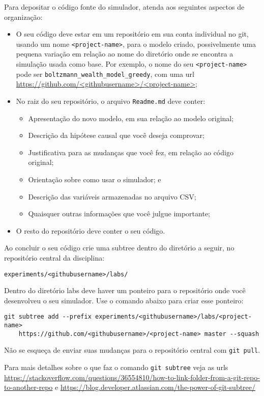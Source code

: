 Para depositar o código fonte do simulador, atenda aos seguintes aspectos de organização:
\begin{itemize}
    \item O seu código deve estar em um repositório em sua conta individual no git, usando um nome \verb|<project-name>|, para o modelo criado, possivelmente uma pequena variação em relação ao nome do diretório onde se encontra a simulação usada como base. Por exemplo, o nome do seu \verb|<project-name>| pode ser
    \verb|boltzmann_wealth_model_greedy|, com uma url \url{https://github.com/<githubusername>/<project-name>};
    \item No raiz do seu repositório, o arquivo \verb|Readme.md| deve conter:
    \begin{itemize}
        \item Apresentação do novo modelo, em sua relação ao modelo original;
        \item Descrição da hipótese causal que você deseja comprovar;
        \item Justificativa para as mudanças que você fez, em relação ao código original;
        \item Orientação sobre como usar o simulador; e
        \item Descrição das variáveis armazenadas no arquivo CSV;
        \item Quaisquer outras informações que você julgue importante;
    \end{itemize}
    \item O resto do repositório deve conter o seu código.
\end{itemize}

Ao concluir o seu código crie uma subtree dentro do diretório a seguir, no repositório central da disciplina:

\verb|experiments/<githubusername>/labs/|

Dentro do diretório labs deve haver um ponteiro para o repositório onde você desenvolveu o seu simulador. Use o comando abaixo para criar esse ponteiro:

{\footnotesize
\begin{verbatim}
git subtree add --prefix experiments/<githubusername>/labs/<project-name> 
    https://github.com/<githubusername>/<project-name> master --squash
\end{verbatim}
}

Não se esqueça de enviar suas mudanças para o repositório central com \verb|git pull|.

Para mais detalhes sobre o que faz o comando \verb|git subtree| veja as urls \url{https://stackoverflow.com/questions/36554810/how-to-link-folder-from-a-git-repo-to-another-repo} e \url{https://blog.developer.atlassian.com/the-power-of-git-subtree/}

